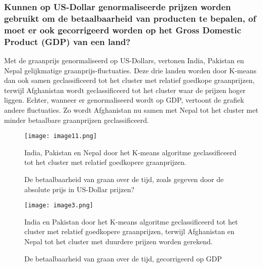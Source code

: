 \documentclass{article}
\begin{document}
\subsubsection*{Kunnen op US-Dollar genormaliseerde prijzen worden gebruikt om de betaalbaarheid van producten te bepalen, of moet er ook gecorrigeerd worden op het Gross Domestic Product (GDP) van een land?}

    Met de graanprijs genormaliseerd op US-Dollars, vertonen India, Pakistan en Nepal gelijkmatige graanprijs-fluctuaties. Deze drie landen worden door K-means dan ook samen geclassificeerd tot het cluster met relatief goedkope graanprijzen, terwijl Afghanistan wordt geclassificeerd tot het cluster waar de prijzen hoger liggen. 
     Echter, wanneer er genormaliseerd wordt op GDP, vertoont de grafiek andere fluctuaties. Zo wordt Afghanistan nu samen met Nepal tot het cluster met minder betaalbare graanprijzen geclassificeerd.
 
 
        \begin{figure}[h]
        \centering
        \texttt{[image: image11.png]}
        \caption{De betaalbaarheid van graan over de tijd, zoals gegeven door de absolute prijs in US-Dollar prijzen?}
        \medskip
        \small
        India, Pakistan en Nepal door het K-means algoritme geclassificeerd tot het cluster met relatief goedkopere graanprijzen.  
        \end{figure}
        
        \begin{figure}[h]
        \centering
        \texttt{[image: image3.png]}
        \caption{De betaalbaarheid van graan over de tijd, gecorrigeerd op GDP}
        \medskip
        \small
        India en Pakistan door het K-means algoritme geclassificeerd tot het cluster met relatief goedkopere graanprijzen, terwijl Afghanistan en Nepal tot het cluster met duurdere prijzen worden gerekend.  
        \end{figure}


 




\newpage

\printbibliography
\end{document}
